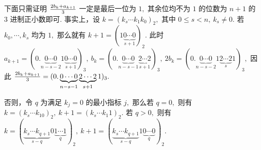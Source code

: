 \documentclass[12pt, a4paper, oneside]{book}
\numberwithin{figure}{section}
\theoremstyle{definition}
\begin{document}
下面只需证明 ${2b_k+a_{k+1}\over 3}$ 一定是最后一位为 $1,$ 其余位均不为 $1$ 的位数为 $n+1$ 的 $3$ 进制正小数即可. 事实上，设 
$k=(k_s\cdots k_1 k_{0})_2,$ 其中 $0\leq s<n,\ k_s\neq 0.$ 若 $k_{0},\cdots,k_s$ 均为 $1,$ 那么就有 $k+1=(1\underbrace{0\cdots 0}_{s+1})_2.$
此时 $a_{k+1}=(0.\underbrace{0\cdots 0}_{n-s-2}1\underbrace{0\cdots 0}_{s+1})_3,\ b_k=(0.\underbrace{0\cdots 0}_{n-s-1}\underbrace{2\cdots 2}_{s+1})_3,\ 2b_k=(0.\underbrace{0\cdots 0}_{n-s-2}1\underbrace{2\cdots 2}_{s}1)_3,$ 因此 
${2b_k+a_{k+1}\over 3}=(0.\underbrace{0\cdots 0}_{n-s-1}\underbrace{2\cdots 2}_{s+1}1)_3.$

否则，令 $q$ 为满足 $k_j=0$ 的最小指标 $j,$ 那么若 $q=0,$ 则有 $k=(k_s\cdots k_10)_2,\ k+1=(k_s \cdots k_1 1)_2.$
若 $q>0,$ 则有 $k=(\underbrace{k_s\cdots k_{q+1}}_{s-q}0\underbrace{1\cdots 1}_{q})_2,\ k+1=(\underbrace{k_s\cdots k_{q+1}}_{s-q}1\underbrace{0\cdots 0}_{q})_2.$
\end{document}
